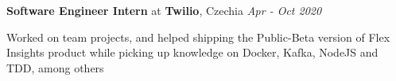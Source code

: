 {\textbf{Software Engineer Intern} at \textbf{Twilio}, Czechia} 
        \hfill {\textit{Apr - Oct 2020}}
    
    Worked on team projects, and helped shipping the Public-Beta version of Flex Insights product while picking up knowledge on Docker, Kafka, NodeJS and TDD, among others